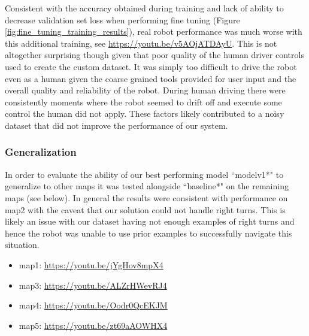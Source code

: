 \documentclass{article}
\begin{document}
Consistent with the accuracy obtained during training and lack of ability to decrease validation set loss when performing fine tuning (Figure \ref{fig:fine_tuning_training_results}), real robot performance was much worse with this additional training, see \url{https://youtu.be/v5AOjATDAyU}. This is not altogether surprising though given that poor quality of the human driver controls used to create the custom dataset. It was simply too difficult to drive the robot even as a human given the coarse grained tools provided for user input and the overall quality and reliability of the robot. During human driving there were consistently moments where the robot seemed to drift off and execute some control the human did not apply. These factors likely contributed to a noisy dataset that did not improve the performance of our system.

\subsubsection{Generalization}

In order to evaluate the ability of our best performing model ``modelv1*" to generalize to other maps it was tested alongside ``baseline*" on the remaining maps (see below). In general the results were consistent with performance on map2 with the caveat that our solution could not handle right turns. This is likely an issue with our dataset having not enough examples of right turns and hence the robot was unable to use prior examples to successfully navigate this situation.

\begin{itemize}
    \item map1: \url{https://youtu.be/jYgHov8mpX4}
    \item map3: \url{https://youtu.be/ALZrHWevRJ4}
    \item map4: \url{https://youtu.be/Oodr0QcEKJM}
    \item map5: \url{https://youtu.be/zt69aAOWHX4}
\end{itemize}
\end{document}
